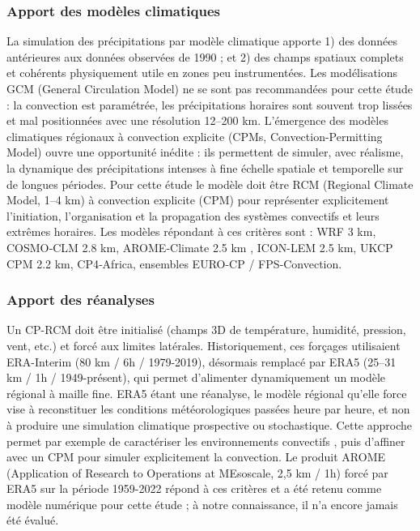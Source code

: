 \documentclass[
  article,
  nofooter,
  noheadings]{jss}
\begin{document}
\subsubsection{Apport des modèles
climatiques}\label{apport-des-moduxe8les-climatiques}

La simulation des précipitations par modèle climatique apporte 1) des
données antérieures aux données observées de 1990 ; et 2) des champs
spatiaux complets et cohérents physiquement utile en zones peu
instrumentées. Les modélisations GCM (General Circulation Model) ne se
sont pas recommandées pour cette étude : la convection est paramétrée,
les précipitations horaires sont souvent trop lissées et mal
positionnées avec une résolution 12--200 km. L'émergence des modèles
climatiques régionaux à convection explicite (CPMs,
Convection-Permitting Model) ouvre une opportunité inédite : ils
permettent de simuler, avec réalisme, la dynamique des précipitations
intenses à fine échelle spatiale et temporelle sur de longues périodes.
Pour cette étude le modèle doit être RCM (Regional Climate Model, 1--4
km) à convection explicite (CPM) pour représenter explicitement
l'initiation, l'organisation et la propagation des systèmes convectifs
et leurs extrêmes horaires. Les modèles répondant à ces critères sont :
WRF 3 km, COSMO‑CLM 2.8 km, AROME‑Climate 2.5 km \citep{cnrm_arome2007},
ICON-LEM 2.5 km, UKCP CPM 2.2 km, CP4‑Africa, ensembles EURO-CP /
FPS‑Convection.

\subsubsection{Apport des réanalyses}\label{apport-des-ruxe9analyses}

Un CP-RCM doit être initialisé (champs 3D de température, humidité,
pression, vent, etc.) et forcé aux limites latérales. Historiquement,
ces forçages utilisaient ERA-Interim (80 km / 6h / 1979-2019), désormais
remplacé par ERA5 (25--31 km / 1h / 1949-présent), qui permet
d'alimenter dynamiquement un modèle régional à maille fine. ERA5 étant
une réanalyse, le modèle régional qu'elle force vise à reconstituer les
conditions météorologiques passées heure par heure, et non à produire
une simulation climatique prospective ou stochastique. Cette approche
permet par exemple de caractériser les environnements convectifs
\citep{ecmwf_era5_data_documentation}, puis d'affiner avec un CPM pour
simuler explicitement la convection. Le produit AROME (Application of
Research to Operations at MEsoscale, 2,5 km / 1h) forcé par ERA5 sur la
période 1959-2022 répond à ces critères et a été retenu comme modèle
numérique pour cette étude ; à notre connaissance, il n'a encore jamais
été évalué.
\end{document}
